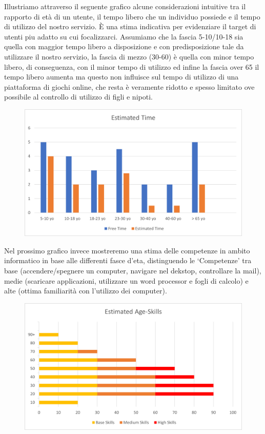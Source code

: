 \documentclass[../Report.tex]{subfiles}
\begin{document}
    Illustriamo attraverso il seguente grafico alcune considerazioni intuitive tra il rapporto di età di un utente, il tempo libero che un individuo possiede e il tempo di utilizzo del nostro servizio. 
    È una stima indicativa per evidenziare il target di utenti piu adatto su cui focalizzarci.
    Assumiamo che la fascia 5-10/10-18 sia quella con maggior tempo libero a disposizione e con predisposizione tale da utilizzare il nostro servizio, la fascia di mezzo (30-60) è quella con minor tempo libero, di conseguenza, con il minor tempo di utilizzo ed infine la fascia over 65 il tempo libero aumenta ma questo non influisce sul tempo di utilizzo di una piattaforma di giochi online, che resta è veramente ridotto e spesso limitato ove possibile al controllo di utilizzo di figli e nipoti. 

    \begin{figure}[H]
        \centering
        \includegraphics{EstimatedTime.png}
    \end{figure}

    Nel prossimo grafico invece mostreremo una stima delle competenze in ambito informatico in base alle differenti fasce d’eta, distinguendo le ‘Competenze’ tra base (accendere/spegnere un computer, navigare nel dekstop, controllare la mail), medie (scaricare applicazioni, utilizzare un word processor e fogli di calcolo) e alte (ottima familiarità con l’utilizzo dei computer).

    \begin{figure}[H]
        \centering
        \includegraphics{EstimatedAgeSkills.png}
    \end{figure}
\end{document}
